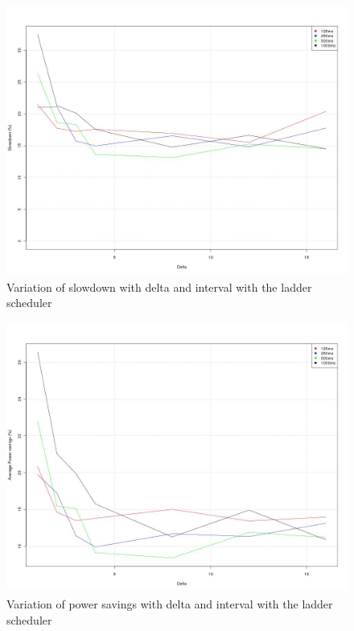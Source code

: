 \begin{figure}[h!]
  \begin{center}
    \includegraphics[height=3.5in]{figures/trends_slowdown_ladder.jpg}%
    \caption{Variation of slowdown with delta and interval with the ladder scheduler}
    \label{fig:slowdown_trends_ladder}
  \end{center}
\end{figure}

\begin{figure}[h!]
  \begin{center}
    \includegraphics[height=3.5in]{figures/trends_avgpwr_ladder.jpg}%
    \caption{Variation of power savings with delta and interval with the ladder scheduler}
    \label{fig:pwr_trends_ladder}
  \end{center}
\end{figure}

